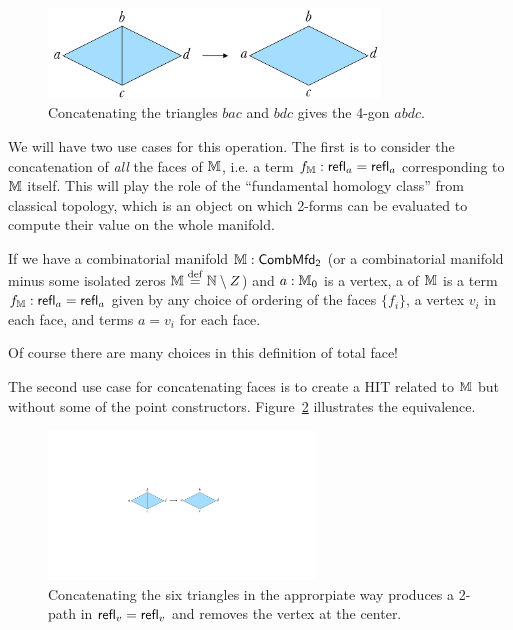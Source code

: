 \begin{figure}[htbp]
\centering
\includegraphics[width=250pt]{concat.pdf}
\caption{Concatenating the triangles \( bac \) and \( bdc \) gives the 4-gon \( abdc \).}
\label{fig:concat}
\end{figure}

We will have two use cases for this operation. The first is to consider the concatenation of \emph{all} the faces of \( \mathbb{M} \), i.e. a term \( f_{\mathbb{M}}:\mathsf{refl}_a=\mathsf{refl}_a \) corresponding to \( \mathbb{M} \) itself. This will play the role of the ``fundamental homology class'' from classical topology, which is an object on which 2-forms can be evaluated to compute their value on the whole manifold. 

\begin{mydef}
\label{def:totalface}
If we have a combinatorial manifold \( \mathbb{M}:\mathsf{CombMfd_2} \) (or a combinatorial manifold minus some isolated zeros \( \mathbb{M}\stackrel{\mathrm{def}}{=}\mathbb{N}\setminus Z \)) and \( a:\mathbb{M}_0 \) is a vertex, a  of \( \mathbb{M} \) is a term \( f_{\mathbb{M}}:\mathsf{refl}_a=\mathsf{refl}_a \) given by any choice of ordering of the faces \( \{f_i\} \), a vertex \( v_i \) in each face, and terms \( a=v_i \) for each face.
\end{mydef}

Of course there are many choices in this definition of total face!

The second use case for concatenating faces is to create a HIT related to \( \mathbb{M} \) but without some of the point constructors. Figure~\ref{fig:hex_concat} illustrates the equivalence.
\begin{figure}[htbp]
\centering
\includegraphics[width=200pt]{hex_concat.pdf}
\caption{Concatenating the six triangles in the approrpiate way produces a 2-path in \( \mathsf{refl}_v=\mathsf{refl}_v \) and removes the vertex at the center.}
\label{fig:hex_concat}
\end{figure}

